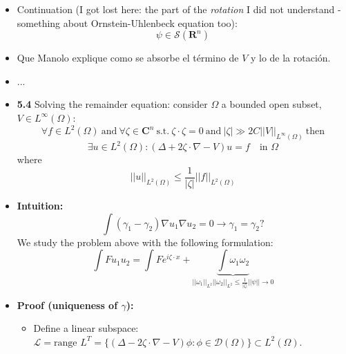 \documentclass{article}
\begin{document}
\begin{itemize}
    \item Continuation (I got lost here: the part of the \textit{rotation} I did not understand - something about Ornstein-Uhlenbeck equation too):
    \begin{equation}
        \psi \in \mathcal{S}(\mathbf{R}^n)
    \end{equation}

    \color{red}
    \item  Que Manolo explique como se absorbe el término de $V$ y lo de la rotación. 
    \color{black}

    \item ...

    \item \textbf{5.4} Solving the remainder equation: consider $\Omega$ a bounded open subset, $V \in L^\infty (\Omega)$:
    \begin{equation}
        \forall f \in L^2(\Omega) \ \text{and} \ \forall \zeta \in \mathbf{C}^n  \ \text{s.t.} \ \zeta \cdot \zeta = 0 \ \text{and}\  |\zeta| \gg 2C||V||_{L^\infty(\Omega)} \ \text{then}
    \end{equation}
    \begin{equation}
        \exists u \in L^2(\Omega): (\Delta + 2\zeta \cdot \nabla - V) u = f \quad \text{in } \Omega
    \end{equation}
    where
    \begin{equation}
        ||u||_{L^2(\Omega)} \leq \frac{1}{|\zeta|} ||f||_{L^2(\Omega)}
    \end{equation}

    \item \textbf{Intuition:} 
    \begin{equation}
        \int (\gamma_1 - \gamma_2) \nabla u_1 \nabla u_2 = 0 \rightarrow \gamma_1 = \gamma_2?
    \end{equation}
    We study the problem above with the following formulation:
    \begin{equation}
        \int F u_1 u_2 = \int F e^{i\zeta \cdot x} + \underbrace{\int \omega_1 \omega_2 }_{||\omega_1||_{L^2} ||\omega_2||_{L^2} \leq \frac{1}{|\zeta|} ||\psi|| \rightarrow 0}
    \end{equation}
    
    \item \textbf{Proof (uniqueness of $\gamma$):}
    \begin{itemize}
        \item Define a linear subspace: $\mathcal{L} = \text{range } L^T = \{ (\Delta - 2\zeta \cdot \nabla - V) \phi:  \phi \in \mathcal{D}(\Omega) \} \subset L^2(\Omega)$. 
        

\end{itemize}
\end{itemize}
\end{document}
